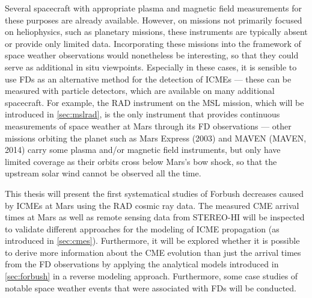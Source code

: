 Several spacecraft with appropriate plasma and magnetic field measurements for these purposes are already available. However, on missions not primarily focused on heliophysics, such as planetary missions, these instruments are typically absent or provide only limited data. Incorporating these missions into the framework of space weather observations would nonetheless be interesting, so that they could serve as additional in situ viewpoints. Especially in these cases, it is sensible to use \acp{FD} as an alternative method for the detection of \acp{ICME} --- these can be measured with particle detectors, which are available on many additional spacecraft. For example, the \ac{RAD} instrument on the \ac{MSL} mission, which will be introduced in \autoref{sec:mslrad}, is the only instrument that provides continuous measurements of space weather at Mars through its \ac{FD} observations --- other missions orbiting the planet such as Mars Express (2003) and \acl{MAVEN} (\acs{MAVEN}, 2014) carry some plasma and/or magnetic field instruments, but only have limited coverage as their orbits cross below Mars's bow shock, so that the upstream solar wind cannot be observed all the time.

This thesis will present the first systematical studies of Forbush decreases caused by \acp{ICME} at Mars using the \ac{RAD} cosmic ray data. The measured \ac{CME} arrival times at Mars as well as remote sensing data from \ac{STEREO}-\ac{HI} will be inspected to validate different approaches for the modeling of \ac{ICME} propagation (as introduced in \autoref{sec:cmes}). Furthermore, it will be explored whether it is possible to derive more information about the \ac{CME} evolution than just the arrival times from the \ac{FD} observations by applying the analytical models introduced in \autoref{sec:forbush} in a reverse modeling approach. Furthermore, some case studies of notable space weather events that were associated with \acp{FD} will be conducted.

